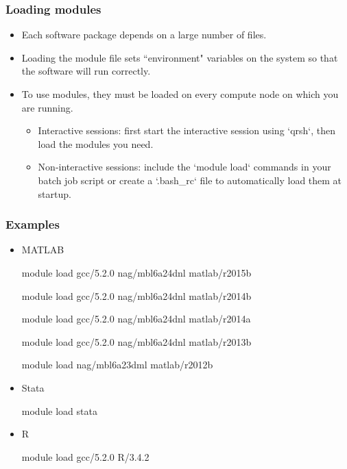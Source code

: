 \documentclass{beamer}
\begin{document}
\begin{frame}
\frametitle{Loading modules}
\begin{itemize}
\item Each software package depends on a large number of files.
\item Loading the module file sets ``environment" variables on the system so that the software will run correctly.
\item To use modules, they must be loaded on every compute node on which you are running.
\begin{itemize}
\item Interactive sessions: first start the interactive session using `qrsh`, then load the modules you need.
\item Non-interactive sessions: include the `module load` commands in your batch job script or create a `.bash\_rc` file to automatically load them at startup.
\end{itemize}
\end{itemize}
\end{frame}

\begin{frame}
\frametitle{Examples}
\begin{itemize}
\item MATLAB \vspace{0.2cm}
\begin{semiverbatim}
module load gcc/5.2.0 nag/mbl6a24dnl matlab/r2015b
\end{semiverbatim} \vspace{-0.4cm}
\begin{semiverbatim}
module load gcc/5.2.0 nag/mbl6a24dnl matlab/r2014b
\end{semiverbatim} \vspace{-0.4cm}
\begin{semiverbatim}
module load gcc/5.2.0 nag/mbl6a24dnl matlab/r2014a
\end{semiverbatim} \vspace{-0.4cm}
\begin{semiverbatim}
module load gcc/5.2.0 nag/mbl6a24dnl matlab/r2013b
\end{semiverbatim} \vspace{-0.4cm}
\begin{semiverbatim}
module load nag/mbl6a23dml matlab/r2012b
\end{semiverbatim} 
\item Stata \vspace{0.2cm}
\begin{semiverbatim}
module load stata
\end{semiverbatim} 
\item R \vspace{0.2cm}
\begin{semiverbatim}
module load gcc/5.2.0 R/3.4.2 
\end{semiverbatim}
\end{itemize}
\end{frame}
\end{document}
